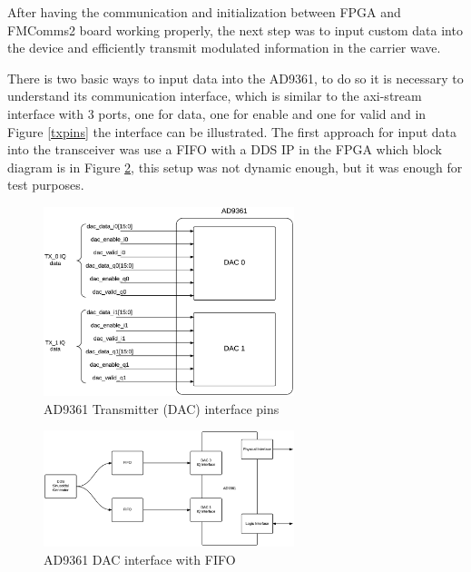 After having the communication and initialization between FPGA and FMComms2
board working properly, the next step was to input custom data into the device
and efficiently transmit modulated information in the carrier wave.

There is two basic ways to input data into the AD9361, to do so it is necessary
to understand its communication interface, which is similar to the axi-stream
interface with 3 ports, one for data, one for enable and one for valid and in
Figure \ref{txpins} the interface can be illustrated. The first approach for
input data into the transceiver was use a FIFO with a DDS IP in the FPGA which
block diagram is in Figure \ref{fig:ad9361txfifo}, this setup was not dynamic
enough, but it was enough for test purposes.

\begin{figure}[htbp]
    \centering
    \includegraphics[width=0.65\textwidth]{./figures/ad9361tx_pins}
    \caption{ AD9361 Transmitter (DAC) interface pins
    \label{fig:txpins}}
\end{figure}


\begin{figure}[htbp]
    \centering
    \includegraphics[width=0.65\textwidth]{./figures/dac_fifo}
    \caption{ AD9361 DAC interface with FIFO
    \label{fig:ad9361txfifo}}
\end{figure}


